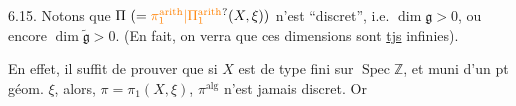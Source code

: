 6.15. Notons que 
$\Pi\ (=\unsure{\pi_1^{\mathrm{arith}}|\Pi_1^{\mathrm{arith}}}(X,\xi))$
n'est  ``discret'', i.e.
 $\dim\mathfrak{g}>0$,
 ou encore
$\dim\widetilde{\mathfrak{g}}>0$. (En fait, on verra que ces dimensions
sont \uline{tjs} infinies).

En effet, il suffit de prouver que si 
$X$ est de type fini sur $\operatorname{Spec}\mathbb{Z}$, et muni d'un
pt géom. $\xi$,  alors,
 
$\pi=\pi_1(X,\xi)$, $\pi^{\mathrm{alg}}$ n'est jamais discret. Or
